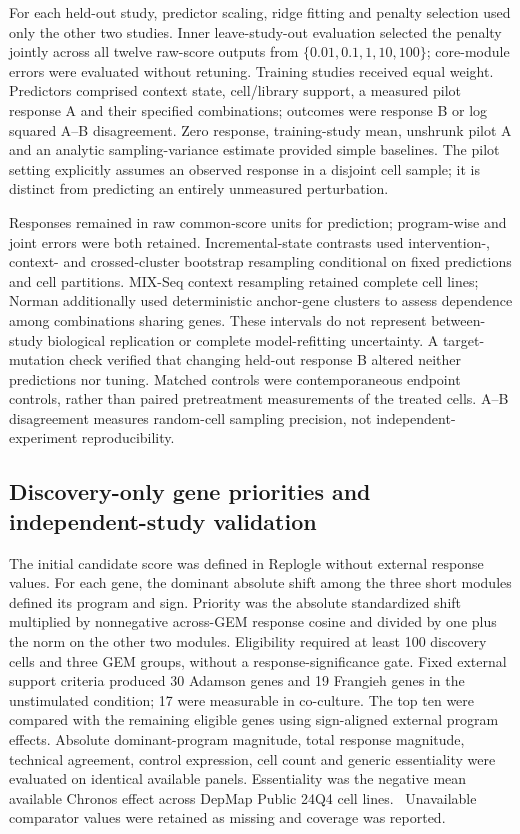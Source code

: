 \documentclass[a4paper,fleqn]{cas-sc}
\makeatletter
\DeclareRobustCommand{\rev}[1]{{\color{red}\def\@citecolor{black}\def\@linkcolor{red}\def\@urlcolor{red}#1}}
\let\unmarkedcite\cite
\renewcommand{\cite}[1]{{\color{black}\def\@citecolor{black}\unmarkedcite{#1}}}
\makeatother
\begin{document}
\rev{For each held-out study, predictor scaling, ridge fitting and penalty selection used only the other two studies.} \rev{Inner leave-study-out evaluation selected the penalty jointly across all twelve raw-score outputs from $\{0.01,0.1,1,10,100\}$; core-module errors were evaluated without retuning.} \rev{Training studies received equal weight.} \rev{Predictors comprised context state, cell/library support, a measured pilot response A and their specified combinations; outcomes were response B or log squared A--B disagreement.} \rev{Zero response, training-study mean, unshrunk pilot A and an analytic sampling-variance estimate provided simple baselines.} \rev{The pilot setting explicitly assumes an observed response in a disjoint cell sample; it is distinct from predicting an entirely unmeasured perturbation.}

\rev{Responses remained in raw common-score units for prediction; program-wise and joint errors were both retained.} \rev{Incremental-state contrasts used intervention-, context- and crossed-cluster bootstrap resampling conditional on fixed predictions and cell partitions.} \rev{MIX-Seq context resampling retained complete cell lines; Norman additionally used deterministic anchor-gene clusters to assess dependence among combinations sharing genes.} \rev{These intervals do not represent between-study biological replication or complete model-refitting uncertainty.} \rev{A target-mutation check verified that changing held-out response B altered neither predictions nor tuning.} \rev{Matched controls were contemporaneous endpoint controls, rather than paired pretreatment measurements of the treated cells.} \rev{A--B disagreement measures random-cell sampling precision, not independent-experiment reproducibility.}

\subsection{\rev{Discovery-only gene priorities and independent-study validation}}

\rev{The initial candidate score was defined in Replogle without external response values.} \rev{For each gene, the dominant absolute shift among the three short modules defined its program and sign.} \rev{Priority was the absolute standardized shift multiplied by nonnegative across-GEM response cosine and divided by one plus the norm on the other two modules.} \rev{Eligibility required at least 100 discovery cells and three GEM groups, without a response-significance gate.} \rev{Fixed external support criteria produced 30 Adamson genes and 19 Frangieh genes in the unstimulated condition; 17 were measurable in co-culture.} \rev{The top ten were compared with the remaining eligible genes using sign-aligned external program effects.} \rev{Absolute dominant-program magnitude, total response magnitude, technical agreement, control expression, cell count and generic essentiality were evaluated on identical available panels.} \rev{Essentiality was the negative mean available Chronos effect across DepMap Public 24Q4 cell lines.~\cite{depmap2024,dempster2021}} \rev{Unavailable comparator values were retained as missing and coverage was reported.}
\end{document}
